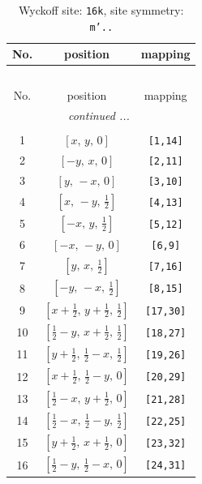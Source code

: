 \documentclass[fleqn,8pt]{jsarticle}
\begin{document}
\renewcommand{\arraystretch}{1.2}
\begin{longtable}{ccc}
\caption{Wyckoff site: {\tt 16k}, site symmetry: {\tt m'..}}
 \\
 \hline \hline
No. & position & mapping \\ \hline \endfirsthead

\multicolumn{2}{l}{\tablename\ \thetable{}} \\
 \hline \hline
No. & position & mapping \\ \hline \endhead

 \hline \hline
\multicolumn{2}{r}{\footnotesize\it continued ...} \\ \endfoot

 \hline \hline
\multicolumn{2}{r}{} \\ \endlastfoot

1 & $\left[ x,\, y,\, 0 \right]$ & {\tt [1,14]} \\ \hline
2 & $\left[ - y,\, x,\, 0 \right]$ & {\tt [2,11]} \\ \hline
3 & $\left[ y,\, - x,\, 0 \right]$ & {\tt [3,10]} \\ \hline
4 & $\left[ x,\, - y,\, \frac{1}{2} \right]$ & {\tt [4,13]} \\ \hline
5 & $\left[ - x,\, y,\, \frac{1}{2} \right]$ & {\tt [5,12]} \\ \hline
6 & $\left[ - x,\, - y,\, 0 \right]$ & {\tt [6,9]} \\ \hline
7 & $\left[ y,\, x,\, \frac{1}{2} \right]$ & {\tt [7,16]} \\ \hline
8 & $\left[ - y,\, - x,\, \frac{1}{2} \right]$ & {\tt [8,15]} \\ \hline
9 & $\left[ x + \frac{1}{2},\, y + \frac{1}{2},\, \frac{1}{2} \right]$ & {\tt [17,30]} \\ \hline
10 & $\left[ \frac{1}{2} - y,\, x + \frac{1}{2},\, \frac{1}{2} \right]$ & {\tt [18,27]} \\ \hline
11 & $\left[ y + \frac{1}{2},\, \frac{1}{2} - x,\, \frac{1}{2} \right]$ & {\tt [19,26]} \\ \hline
12 & $\left[ x + \frac{1}{2},\, \frac{1}{2} - y,\, 0 \right]$ & {\tt [20,29]} \\ \hline
13 & $\left[ \frac{1}{2} - x,\, y + \frac{1}{2},\, 0 \right]$ & {\tt [21,28]} \\ \hline
14 & $\left[ \frac{1}{2} - x,\, \frac{1}{2} - y,\, \frac{1}{2} \right]$ & {\tt [22,25]} \\ \hline
15 & $\left[ y + \frac{1}{2},\, x + \frac{1}{2},\, 0 \right]$ & {\tt [23,32]} \\ \hline
16 & $\left[ \frac{1}{2} - y,\, \frac{1}{2} - x,\, 0 \right]$ & {\tt [24,31]} \\
\end{longtable}
\end{document}
